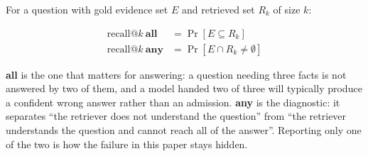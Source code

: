 For a question with gold evidence set $E$ and retrieved set $R_k$ of size $k$:

\begin{align*}
\text{recall@}k\ \textbf{all} &= \Pr\left[E \subseteq R_k\right] \\
\text{recall@}k\ \textbf{any} &= \Pr\left[E \cap R_k \neq \emptyset\right]
\end{align*}

\textbf{all} is the one that matters for answering: a question needing three
facts is not answered by two of them, and a model handed two of three will
typically produce a confident wrong answer rather than an admission. \textbf{any}
is the diagnostic: it separates ``the retriever does not understand the
question'' from ``the retriever understands the question and cannot reach all of
the answer''. Reporting only one of the two is how the failure in this paper
stays hidden.
